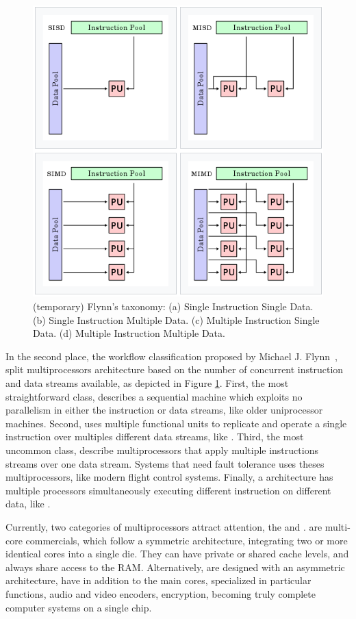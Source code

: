			\begin{figure}[h]
				\centering
				\includegraphics[width=.6\textwidth]{images/flynn.png}

				\caption{
					(temporary) Flynn's taxonomy:
					(a) Single Instruction Single Data.
					(b) Single Instruction Multiple Data.
					(c) Multiple Instruction Single Data.
					(d) Multiple Instruction Multiple Data.
				}\par
				\label{fig::flynn}
			\end{figure}

			In the second place, the workflow classification proposed by Michael J. Flynn~\cite{Flynn},
			split multiprocessors architecture based on the number of concurrent
			instruction and data streams available, as depicted in Figure \ref{fig::flynn}.
			First, the most straightforward class, \sisd describes a sequential
			machine which exploits no parallelism in either the instruction or
			data streams, like older uniprocessor machines.
			Second, \simd uses multiple functional units to replicate and operate
			a single instruction over multiples different data streams, like \gpu.
			Third, the most uncommon class, \misd describe multiprocessors that
			apply multiple instructions streams over one data stream.
			Systems that need fault tolerance uses theses multiprocessors, like
			modern flight control systems.
			Finally, a \mimd architecture has multiple processors simultaneously
			executing different instruction on different data, like \xeonphi.

			Currently, two categories of multiprocessors attract attention, the \cmp and \soc.
			\cmps are multi-core commercials, which follow a symmetric architecture,
			integrating two or more identical cores into a single die.
			They can have private or shared cache levels, and always share access
			to the RAM.
			Alternatively, \socs are designed with an asymmetric architecture,
			have in addition to the main cores, specialized \cpus in particular
			functions, \eg audio and video encoders, encryption, becoming truly
			complete computer systems on a single chip.

